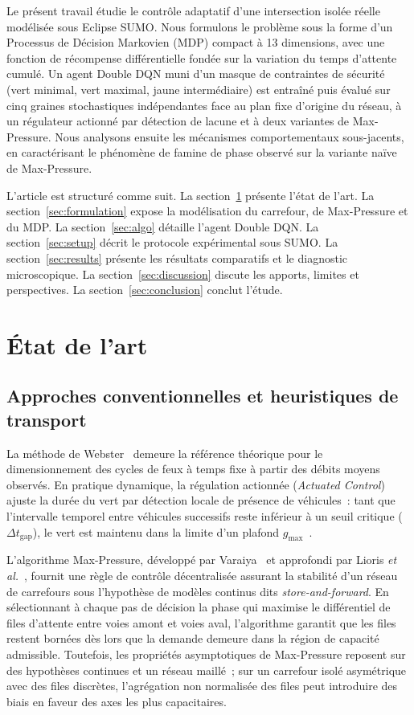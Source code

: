 \documentclass[10pt,twocolumn,letterpaper]{article}
\begin{document}
Le présent travail étudie le contrôle adaptatif d'une intersection isolée réelle modélisée sous Eclipse SUMO. Nous formulons le problème sous la forme d'un Processus de Décision Markovien (MDP) compact à 13 dimensions, avec une fonction de récompense différentielle fondée sur la variation du temps d'attente cumulé. Un agent Double DQN muni d'un masque de contraintes de sécurité (vert minimal, vert maximal, jaune intermédiaire) est entraîné puis évalué sur cinq graines stochastiques indépendantes face au plan fixe d'origine du réseau, à un régulateur actionné par détection de lacune et à deux variantes de Max-Pressure. Nous analysons ensuite les mécanismes comportementaux sous-jacents, en caractérisant le phénomène de famine de phase observé sur la variante naïve de Max-Pressure.

L'article est structuré comme suit. La section~\ref{sec:related} présente l'état de l'art. La section~\ref{sec:formulation} expose la modélisation du carrefour, de Max-Pressure et du MDP. La section~\ref{sec:algo} détaille l'agent Double DQN. La section~\ref{sec:setup} décrit le protocole expérimental sous SUMO. La section~\ref{sec:results} présente les résultats comparatifs et le diagnostic microscopique. La section~\ref{sec:discussion} discute les apports, limites et perspectives. La section~\ref{sec:conclusion} conclut l'étude.

\section{État de l'art}
\label{sec:related}

\subsection{Approches conventionnelles et heuristiques de transport}
La méthode de Webster~\cite{webster1958traffic} demeure la référence théorique pour le dimensionnement des cycles de feux à temps fixe à partir des débits moyens observés. En pratique dynamique, la régulation actionnée (\emph{Actuated Control}) ajuste la durée du vert par détection locale de présence de véhicules~: tant que l'intervalle temporel entre véhicules successifs reste inférieur à un seuil critique ($\Delta t_{\text{gap}}$), le vert est maintenu dans la limite d'un plafond $g_{\max}$~\cite{day2016detector}.

L'algorithme Max-Pressure, développé par Varaiya~\cite{varaiya2013max} et approfondi par Lioris \emph{et al.}~\cite{lioris2016max}, fournit une règle de contrôle décentralisée assurant la stabilité d'un réseau de carrefours sous l'hypothèse de modèles continus dits \emph{store-and-forward}. En sélectionnant à chaque pas de décision la phase qui maximise le différentiel de files d'attente entre voies amont et voies aval, l'algorithme garantit que les files restent bornées dès lors que la demande demeure dans la région de capacité admissible. Toutefois, les propriétés asymptotiques de Max-Pressure reposent sur des hypothèses continues et un réseau maillé~; sur un carrefour isolé asymétrique avec des files discrètes, l'agrégation non normalisée des files peut introduire des biais en faveur des axes les plus capacitaires.
\end{document}
